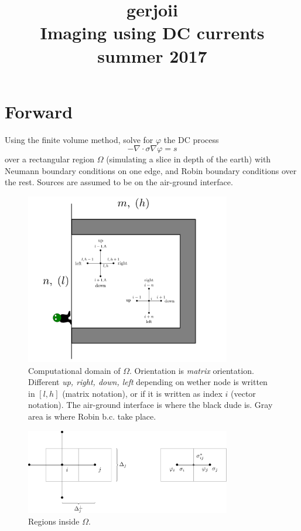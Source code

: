 \documentclass[a4paper,12pt]{article}
\title{\Huge{
\color{nblue}g\color{nred}er\color{ngreen}j\color{nblue}o\color{nred}i\color{moradoAmor}i}
\color{black}\\ Imaging using DC currents \\ \small{summer 2017}}
\author{}
\date{}
\begin{document}
\maketitle
\section{Forward}
Using the finite volume method, solve for $\varphi$ the DC process
\[
-\nabla\cdot\sigma\nabla \varphi = s 
\]
over a rectangular region $\Omega$ (simulating a slice in depth of the earth) with Neumann boundary 
conditions on one edge, and Robin boundary conditions over the rest. Sources are assumed to be on the 
air-ground interface.
\begin{figure}
\centering
\includegraphics[width=0.8\textwidth]{../pics/tikz/svg/domain.pdf} 
\caption{Computational domain of $\Omega$. Orientation is {\it matrix} orientation. 
Different {\it up, right, down, left} depending on wether node is written in $[l,h]$ (matrix notation), 
or if it is written as index $i$ (vector notation). The air-ground interface is where the black dude is. 
Gray area is where Robin b.c. take place.}
\end{figure}
%
\begin{figure}
\centering
\includegraphics[width=0.8\textwidth]{../pics/tikz/svg/regions.pdf} 
\caption{Regions inside $\Omega$.}
\end{figure}
\end{document}
